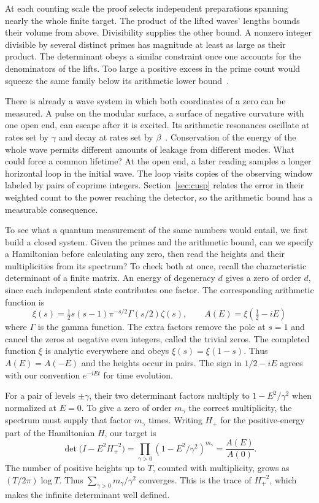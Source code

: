 \documentclass[11pt,letterpaper]{article}
\numberwithin{equation}{section}
\begin{document}
At each counting scale the proof selects independent preparations spanning nearly the whole finite target. The product of the lifted waves' lengths bounds their volume from above. Divisibility supplies the other bound. A nonzero integer divisible by several distinct primes has magnitude at least as large as their product. The determinant obeys a similar constraint once one accounts for the denominators of the lifts. Too large a positive excess in the prime count would squeeze the same family below its arithmetic lower bound~\cite{volumelean}.

There is already a wave system in which both coordinates of a zero can be measured. A pulse on the modular surface, a surface of negative curvature with one open end, can escape after it is excited. Its arithmetic resonances oscillate at rates set by $\gamma$ and decay at rates set by $\beta$~\cite{uetake}. Conservation of the energy of the whole wave permits different amounts of leakage from different modes. What could force a common lifetime? At the open end, a later reading samples a longer horizontal loop in the initial wave. The loop visits copies of the observing window labeled by pairs of coprime integers. Section~\ref{sec:cusp} relates the error in their weighted count to the power reaching the detector, so the arithmetic bound has a measurable consequence.

To see what a quantum measurement of the same numbers would entail, we first build a closed system. Given the primes and the arithmetic bound, can we specify a Hamiltonian before calculating any zero, then read the heights and their multiplicities from its spectrum? To check both at once, recall the characteristic determinant of a finite matrix. An energy of degeneracy $d$ gives a zero of order $d$, since each independent state contributes one factor. The corresponding arithmetic function is
\begin{equation}
 \xi(s)=\tfrac12s(s-1)\pi^{-s/2}\Gamma(s/2)\zeta(s),
 \qquad A(E)=\xi(\tfrac12-iE)
 \label{eq:completion}
\end{equation}
where $\Gamma$ is the gamma function. The extra factors remove the pole at $s=1$ and cancel the zeros at negative even integers, called the trivial zeros. The completed function $\xi$ is analytic everywhere and obeys $\xi(s)=\xi(1-s)$. Thus $A(E)=A(-E)$ and the heights occur in pairs. The sign in $1/2-iE$ agrees with our convention $e^{-iEt}$ for time evolution.

For a pair of levels $\pm\gamma$, their two determinant factors multiply to $1-E^2/\gamma^2$ when normalized at $E=0$. To give a zero of order $m_\gamma$ the correct multiplicity, the spectrum must supply that factor $m_\gamma$ times. Writing $H_+$ for the positive-energy part of the Hamiltonian $H$, our target is
\begin{equation}
 \det\bigl(I-E^2H_+^{-2}\bigr)=
 \prod_{\gamma>0}(1-E^2/\gamma^2)^{m_\gamma}
 =\frac{A(E)}{A(0)} .
 \label{eq:det}
\end{equation}
The number of positive heights up to $T$, counted with multiplicity, grows as $(T/2\pi)\log T$. Thus $\sum_{\gamma>0}m_\gamma/\gamma^2$ converges. This is the trace of $H_+^{-2}$, which makes the infinite determinant well defined.
\end{document}
